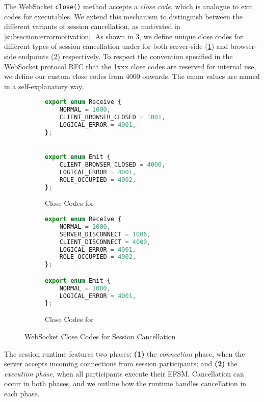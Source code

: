 The WebSocket \texttt{close()} method accepts a 
\textit{close code}, which is analogue to exit codes for
executables. We extend this mechanism to distinguish
between the different variants of session cancellation,
as motivated in \cref{subsection:errormotivation}.
As shown in \cref{fig:cancelenum},
we define unique close codes for different types
of session cancellation under 
for both server-side (\cref{subfig:cancelenumsvr})
and browser-side endpoints (\cref{subfig:cancelenumclient}) 
respectively. 
To respect the convention specified in the WebSocket protocol
RFC \cite{WebSocketRFC} that the 1xxx close codes 
are reserved for internal use,
we define our custom close codes from 4000 onwards.
The enum values are named in a self-explanatory way.

\begin{figure}[!h]
\begin{subfigure}{0.48\textwidth}
\begin{lstlisting}[language=javascript,tabsize=2]
export enum Receive {
	NORMAL = 1000,
	CLIENT_BROWSER_CLOSED = 1001,
	LOGICAL_ERROR = 4001,
};


export enum Emit {
	CLIENT_BROWSER_CLOSED = 4000,
	LOGICAL_ERROR = 4001,
	ROLE_OCCUPIED = 4002,
};
\end{lstlisting}
\caption{Close Codes for }
\label{subfig:cancelenumsvr}
\end{subfigure}
\hfill
\begin{subfigure}{0.48\textwidth}
\begin{lstlisting}[language=javascript,tabsize=2]
export enum Receive {
	NORMAL = 1000,
	SERVER_DISCONNECT = 1006,
	CLIENT_DISCONNECT = 4000,
	LOGICAL_ERROR = 4001,
	ROLE_OCCUPIED = 4002,
};

export enum Emit {
	NORMAL = 1000,
	LOGICAL_ERROR = 4001,
};
\end{lstlisting}
\caption{Close Codes for }
\label{subfig:cancelenumclient}
\end{subfigure}
\caption{WebSocket Close Codes for Session Cancellation}
\label{fig:cancelenum}
\end{figure}

The session runtime features two phases:
\textbf{(1)} the \textit{connection} phase, when the server
accepts incoming connections from session participants;
and \textbf{(2)} the \textit{execution phase}, when all
participants execute their EFSM.
Cancellation can occur in both phases, and we outline
how the runtime handles cancellation in each phase.

